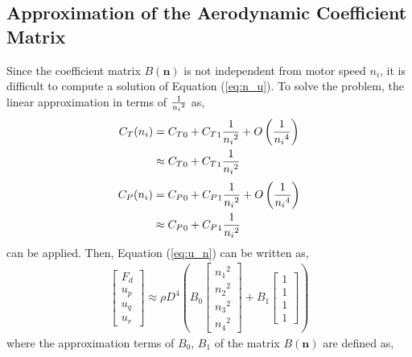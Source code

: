 \subsection{Approximation of the Aerodynamic Coefficient Matrix}
Since the coefficient matrix \( B ({\boldsymbol n}) \) is not independent from motor speed \(n_i\), it is difficult to compute a solution of Equation (\ref{eq:n_u}). To solve the problem, the linear approximation in terms of \(1 \over {n_i}^2\) as,\\
\begin{equation}
\label{eq:ct_approx}
\begin{aligned}
C_T ({n_i}) & = {C_T}_0 + {C_T}_1 {1 \over {n_i}^2} + O \left({1 \over {n_i}^4} \right) \\
& \approx {C_T}_0 + {C_T}_1 {1 \over {n_i}^2} \\
\end{aligned}
\end{equation}
\begin{equation}
\label{eq:cp_approx}
\begin{aligned}
C_P ({n_i}) & = {C_P}_0 + {C_P}_1 {1 \over {n_i}^2} + O \left({1 \over {n_i}^4} \right) \\
& \approx {C_P}_0 + {C_P}_1 {1 \over {n_i}^2}
\end{aligned}
\end{equation}
can be applied. Then, Equation (\ref{eq:u_n}) can be written as, \\
\begin{equation}
\begin{aligned}
\begin{bmatrix}
F_d\\
u_p\\
u_q\\
u_r
\end{bmatrix}
\approx \rho D^4 \left( B_0
\begin{bmatrix}
{n_1}^2 \\
{n_2}^2 \\
{n_3}^2 \\
{n_4}^2
\end{bmatrix}
+ B_1 
\begin{bmatrix}
1\\
1\\
1\\
1
\end{bmatrix} \right)
\end{aligned}
\end{equation}
where the approximation terms of \( B_0\), \(B_1\) of the matrix \(B ({\boldsymbol n}) \) are defined as,
